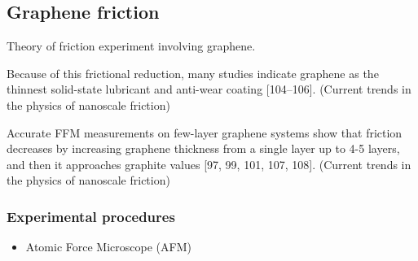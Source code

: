 





\subsection{Graphene friction}
Theory of friction experiment involving graphene.


Because of this frictional reduction, many studies indicate graphene as the
thinnest solid-state lubricant and anti-wear coating [104–106]. (Current trends
in the physics of nanoscale friction)


Accurate FFM measurements on few-layer graphene systems show that friction
decreases by increasing graphene thickness from a single layer up to 4-5 layers,
and then it approaches graphite values [97, 99, 101, 107, 108]. (Current trends
in the physics of nanoscale friction)


\subsubsection{Experimental procedures}

\begin{itemize}
  \item Atomic Force Microscope (AFM)
\end{itemize}


